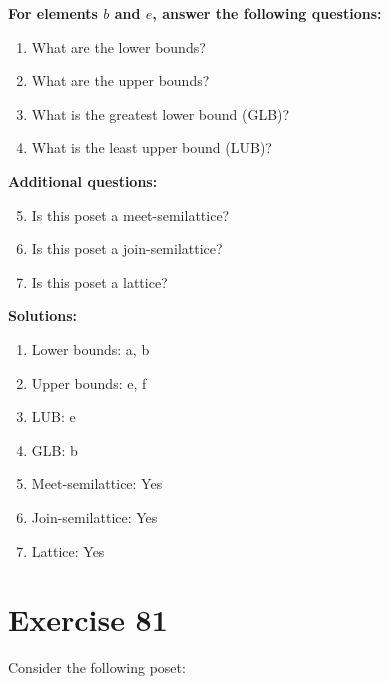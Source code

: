 \documentclass{article}
\begin{document}
    \textbf{For elements $b$ and $e$, answer the following questions:}
\begin{enumerate}
    \item What are the lower bounds?
    \item What are the upper bounds?
    \item What is the greatest lower bound (GLB)?
    \item What is the least upper bound (LUB)?
\end{enumerate}
    \hspace*{3ex} \textbf{Additional questions:}
\begin{enumerate}
    \setcounter{enumi}{4}
    \item Is this poset a meet-semilattice?
    \item Is this poset a join-semilattice?
    \item Is this poset a lattice?
\end{enumerate}

\textbf{Solutions:}
\begin{enumerate}
    \item Lower bounds: {a, b}
    \item Upper bounds: {e, f}
    \item LUB: e
    \item GLB: b
    \item Meet-semilattice: Yes
    \item Join-semilattice: Yes
    \item Lattice: Yes
\end{enumerate}
\newpage
\section*{Exercise 81}
Consider the following poset:
\begin{center}
\end{center}
\end{document}
